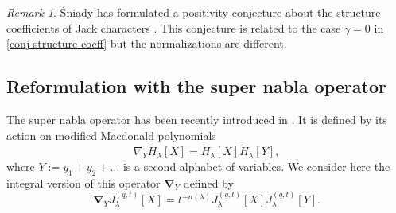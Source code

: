 \documentclass[12pt]{amsart}
\theoremstyle{remark}
\newtheorem{rmq}{Remark}
\newcommand{\J}{{J}^{(q,t)}}
\newcommand{\nablaJ}{\boldsymbol{\nabla}}
\begin{document}
\begin{rmq}
    \'{S}niady has formulated a positivity conjecture about the structure coefficients of Jack characters \cite[Conjecture 2.2]{Sniady2019}. This conjecture is related to the case $\gamma=0$ in \cref{conj structure coeff} but the normalizations are different.
\end{rmq}

\subsection{Reformulation with the super nabla operator}\label{sec Reformulation nabla}
The super nabla operator has been recently introduced in \cite{BergeronHaglundIraciRomero2023}. It is defined by its action on modified Macdonald polynomials 
$$\nabla_Y \widetilde H_\lambda[X]=\widetilde H_\lambda[X] \widetilde H_\lambda[Y],$$
where $Y:=y_1+y_2+\dots$ is a second alphabet of variables. We consider here the integral version of this operator $\nablaJ_Y$ defined by 
$$\nablaJ_Y \J_\lambda[X]=t^{-n(\lambda)}\J_\lambda[X] \J_\lambda\left[Y\right].$$
\end{document}
